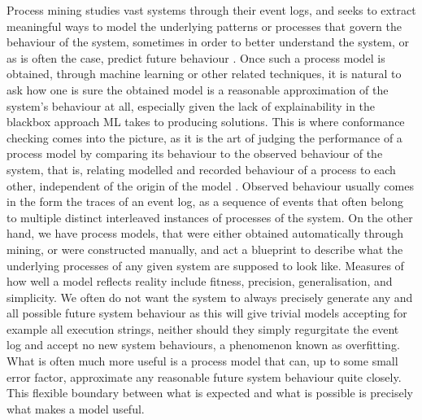 \documentclass{article}
\theoremstyle{Definition}
\theoremstyle{definition}
\begin{document}
	Process mining studies vast systems through their event logs, and seeks to extract meaningful ways to model the underlying patterns or processes that govern the behaviour of the system, sometimes in order to better understand the system, or as is often the case, predict future behaviour \cite{A16}.
	 Once such a process model is obtained, through machine learning or other related techniques, it is natural to ask how one is sure the obtained model is a reasonable approximation of the system’s behaviour at all, especially given the lack of explainability in the blackbox approach ML takes to producing solutions.
	 This is where conformance checking comes into the picture, as it is the art of judging the performance of a process model by comparing its behaviour to the observed behaviour of the system, that is, relating modelled and recorded behaviour of a process to each other, independent of the origin of the model \cite{CDSW18}.
	 Observed behaviour usually comes in the form the traces of an event log, as a sequence of events that often belong to multiple distinct interleaved instances of processes of the system.
	 On the other hand, we have process models, that were either obtained automatically through mining, or were constructed manually, and act a blueprint to describe what the underlying processes of any given system are supposed to look like.
	 Measures of how well a model reflects reality include fitness, precision, generalisation, and simplicity.
	 We often do not want the system to always precisely generate any and all possible future system behaviour as this will give trivial models accepting for example all execution strings, neither should they simply regurgitate the event log and accept no new system behaviours, a phenomenon known as overfitting.
	 What is often much more useful is a process model that can, up to some small error factor, approximate any reasonable future system behaviour quite closely. 
	 This flexible boundary between what is expected and what is possible is precisely what makes a model useful. 
	
\end{document}
